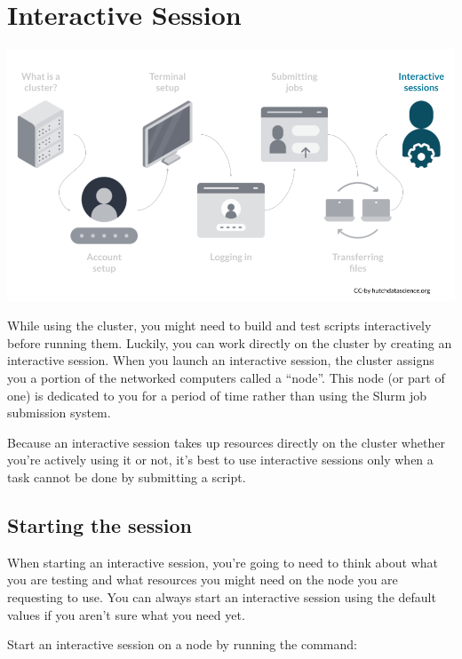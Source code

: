 \documentclass[
]{book}
\begin{document}
\hypertarget{interactive-session}{%
\chapter{Interactive Session}\label{interactive-session}}

\begin{center}\includegraphics[width=0.8\linewidth]{resources/images/07-interactive_files/figure-latex//1BQxrVYdKZTbpCaF-i_q9w7s9x034lEXpQZDU-Sl09cs_gff2211b72f_1_275} \end{center}

While using the cluster, you might need to build and test scripts interactively before running them. Luckily, you can work directly on the cluster by creating an interactive session. When you launch an interactive session, the cluster assigns you a portion of the networked computers called a ``node''. This node (or part of one) is dedicated to you for a period of time rather than using the Slurm job submission system.

Because an interactive session takes up resources directly on the cluster whether you're actively using it or not, it's best to use interactive sessions only when a task cannot be done by submitting a script.

\hypertarget{starting-the-session}{%
\section{Starting the session}\label{starting-the-session}}

When starting an interactive session, you're going to need to think about what you are testing and what resources you might need on the node you are requesting to use. You can always start an interactive session using the default values if you aren't sure what you need yet.

Start an interactive session on a node by running the command:
\end{document}

